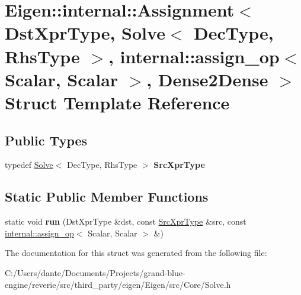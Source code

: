 \hypertarget{struct_eigen_1_1internal_1_1_assignment_3_01_dst_xpr_type_00_01_solve_3_01_dec_type_00_01_rhs_ty3ce26f5f592c582be15e9bcd7c0c0744}{}\section{Eigen\+::internal\+::Assignment$<$ Dst\+Xpr\+Type, Solve$<$ Dec\+Type, Rhs\+Type $>$, internal\+::assign\+\_\+op$<$ Scalar, Scalar $>$, Dense2\+Dense $>$ Struct Template Reference}
\label{struct_eigen_1_1internal_1_1_assignment_3_01_dst_xpr_type_00_01_solve_3_01_dec_type_00_01_rhs_ty3ce26f5f592c582be15e9bcd7c0c0744}
\subsection*{Public Types}
\begin{DoxyCompactItemize}
\item 
\mbox{\label{struct_eigen_1_1internal_1_1_assignment_3_01_dst_xpr_type_00_01_solve_3_01_dec_type_00_01_rhs_ty3ce26f5f592c582be15e9bcd7c0c0744_ae98cd3a314e6b89b174d705bf289b540}} 
typedef \mbox{\hyperlink{class_eigen_1_1_solve}{Solve}}$<$ Dec\+Type, Rhs\+Type $>$ {\bfseries Src\+Xpr\+Type}
\end{DoxyCompactItemize}
\subsection*{Static Public Member Functions}
\begin{DoxyCompactItemize}
\item 
\mbox{\label{struct_eigen_1_1internal_1_1_assignment_3_01_dst_xpr_type_00_01_solve_3_01_dec_type_00_01_rhs_ty3ce26f5f592c582be15e9bcd7c0c0744_a99f3f4b2a24f06cb5ddda40ec8326aab}} 
static void {\bfseries run} (Dst\+Xpr\+Type \&dst, const \mbox{\hyperlink{class_eigen_1_1_solve}{Src\+Xpr\+Type}} \&src, const \mbox{\hyperlink{struct_eigen_1_1internal_1_1assign__op}{internal\+::assign\+\_\+op}}$<$ Scalar, Scalar $>$ \&)
\end{DoxyCompactItemize}


The documentation for this struct was generated from the following file\+:\begin{DoxyCompactItemize}
\item 
C\+:/\+Users/dante/\+Documents/\+Projects/grand-\/blue-\/engine/reverie/src/third\+\_\+party/eigen/\+Eigen/src/\+Core/Solve.\+h\end{DoxyCompactItemize}
